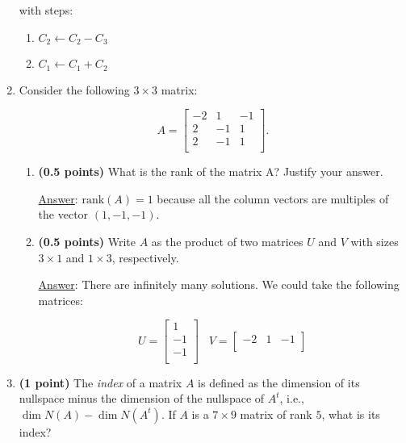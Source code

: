\documentclass[]{book}
\theoremstyle{definition}
\newcommand{\rank}[1]{\textrm{rank}({#1})}
\newcommand\ans{\underline{Answer}: }
\begin{document}
\begin{enumerate}
with steps: 
\begin{enumerate}
\item $C_2 \leftarrow C_2 - C_3$
\item $C_1 \leftarrow C_1 + C_2$
\end{enumerate}



\item Consider the following $3\times 3$ matrix:

\[
   A=
  \left[ {\begin{array}{ccc}
   -2 & 1 & -1 \\
   2 & -1 & 1 \\
   2 & -1 & 1 \\
  \end{array} } \right].
\]

\begin{enumerate}
\item {\bf (0.5 points)} What is the rank of the matrix A? Justify your answer.

\ans $\rank{A} = 1$ because all the column vectors are multiples of the vector $(1, -1, -1)$.

\item {\bf (0.5 points)} Write $A$ as the product of two matrices $U$ and $V$ with sizes $3\times 1$ and $1\times 3$, respectively.

\ans There are infinitely many solutions. We could take the following matrices:

\[
   U=
  \left[ 
  {\begin{array}{ccc}
  1 \\
  -1 \\
  -1 \\
  \end{array} } \right]
\;\;\;
   V=
  \left[
  {\begin{array}{ccc}
  -2 & 1 & -1 \\
  \end{array} } 
   \right]
\]

\end{enumerate} 






\item {\bf (1 point)} The \emph{index} of a matrix $A$ is defined as the dimension of its nullspace minus the dimension of the nullspace of $A^t$, i.e., $\dim{N(A)} - \dim{N(A^t)}$. If $A$ is a $7\times 9$ matrix of rank $5$, what is its index?


\end{enumerate}
\end{document}
